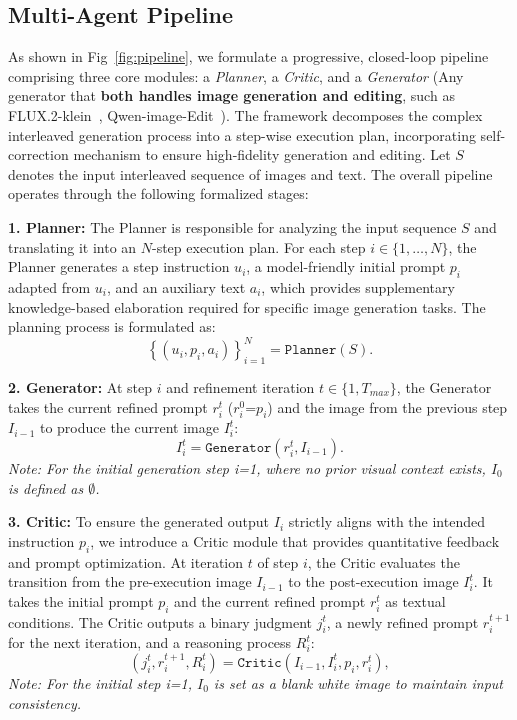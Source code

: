 \documentclass{article} %
\begin{document}
\subsection{Multi-Agent Pipeline}
\label{subsec:workflow}
As shown in Fig~\ref{fig:pipeline}, we formulate a progressive, closed-loop pipeline comprising three core modules: a \textit{Planner}, a \textit{Critic}, and a \textit{Generator} (Any generator that \textbf{both handles image generation and editing}, such as FLUX.2-klein~\cite{flux2}, Qwen-image-Edit~\cite{qwenimage}). The framework decomposes the complex interleaved generation process into a step-wise execution plan, incorporating self-correction mechanism to ensure high-fidelity generation and editing. Let $S$ denotes the input interleaved sequence of images and text. The overall pipeline operates through the following formalized stages:

\textbf{1. Planner:} 
The Planner is responsible for analyzing the input sequence $S$ and translating it into an $N$-step execution plan. For each step $i \in \{1, \dots, N\}$, the Planner generates a step instruction $u_i$, a model-friendly initial prompt $p_i$ adapted from $u_i$, and an auxiliary text $a_i$, which provides supplementary knowledge-based elaboration required for specific image generation tasks. The planning process is formulated as:
\begin{equation}
   \left\{ \left(u_i, p_i, a_i \right) \right\}_{i=1}^N = \texttt{Planner}(S).
\end{equation}

\textbf{2. Generator:} 
At step $i$ and refinement iteration $t \in \{1, T_{max}\}$, the Generator takes the current refined prompt $r_i^t$ ($r_i^0$=$p_i$) and the image from the previous step $I_{i-1}$ to produce the current image $I_i^t$:
\begin{equation}
    I_i^t = \texttt{Generator}\left(r_i^t, I_{i-1}\right).
\end{equation}
\textit{Note: For the initial generation step i=1, where no prior visual context exists, $I_0$ is defined as $\emptyset$.}

\textbf{3. Critic:} 
To ensure the generated output $I_i$ strictly aligns with the intended instruction $p_i$, we introduce a Critic module that provides quantitative feedback and prompt optimization. At iteration $t$ of step $i$, the Critic evaluates the transition from the pre-execution image $I_{i-1}$ to the post-execution image $I_i^t$. It takes the initial prompt $p_i$ and the current refined prompt $r_i^t$ as textual conditions. The Critic outputs a binary judgment $j_i^t$, a newly refined prompt $r_i^{t+1}$ for the next iteration, and a reasoning process $R_i^t$:
\begin{equation}
    \left(j_i^t, r_i^{t+1}, R_i^t \right) = \texttt{Critic}\left(I_{i-1}, I_i^t, p_i, r_i^t\right),
\end{equation}
\textit{Note: For the initial step i=1, $I_0$ is set as a blank white image to maintain input consistency.}
\end{document}

